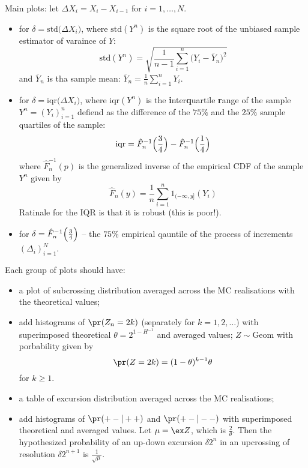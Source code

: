 Main plots: let $\Delta X_i = X_i - X_{i-1}$ for $i=1,\ldots, N$.
\begin{itemize}
	\item for $\delta = \text{std}\bigl(\Delta X_i \bigr)$, where $\text{std}(Y^n)$ is
	the square root of the unbiased sample estimator of varaince of $Y$:
	\[ \text{std}(Y^n) = \sqrt{ \frac{1}{n-1} \sum_{i=1}^n \bigl( Y_i - \bar{Y}_n \bigr)^2 }\]
	and $\bar{Y}_n$ is tha sample mean: $\bar{Y}_n = \frac{1}{n}\sum_{i=1}^n Y_i$. 

	\item for $\delta = \text{iqr}\bigl(\Delta X_i \bigr)$, where $\text{iqr}(Y^n)$ is
	the \textbf{i}nter\textbf{q}uartile \textbf{r}ange of the sample $Y^n = (Y_i)_{i=1}^n$
	defiend as the difference of the $75\%$ and the $25\%$ sample quartiles of the sample:
	\[\text{iqr} = \hat{F}^{-1}_n\Bigl(\frac{3}{4}\Bigr) - \hat{F}^{-1}_n\Bigl(\frac{1}{4}\Bigr)\]
	where $\hat{F}^{-1}_n(p)$ is the generalized inverse of the empirical CDF of the sample $Y^n$
	given by
	\[\hat{F}_n(y) = \frac{1}{n} \sum_{i=1}^n 1_{(-\infty,y]}(Y_i)\]
	Ratinale for the IQR is that it is robust (this is poor!).
	\item for $\delta = \hat{F}^{-1}_n\Bigl(\frac{3}{4}\Bigr)$ -- the $75\%$ empirical qauntile of
	the process of increments $(\Delta_i)_{i=1}^N$.
\end{itemize}

Each group of plots should have: \begin{itemize}
	\item a plot of subcrossing distribution averaged across the MC realisations with
	the theoretical values;
	\item add histograms of $\pr(Z_n = 2k)$ (separately for $k=1,2,\ldots$) with
	superimposed theoretical $\theta = 2^{1-H^{-1}}$ and averaged values;
	$Z\sim\text{Geom}$ with porbability given by
	\[\pr(Z = 2k) = (1-\theta)^{k-1} \theta\]
	for $k\geq 1$.
	\item a table of excursion distribution averaged across the MC realisations;
	\item add histograms of $\pr(+-|++)$ and $\pr(+-|--)$ with superimposed theoretical
	and averaged values. Let $\mu = \ex Z$, which is $\frac{2}{\theta}$. Then the
	hypothesized probability of an up-down excursion $\delta 2^n$ in an upcrossing
	of resolution $\delta 2^{n+1}$ is $\frac{1}{\sqrt{\mu}}$.
\end{itemize}


